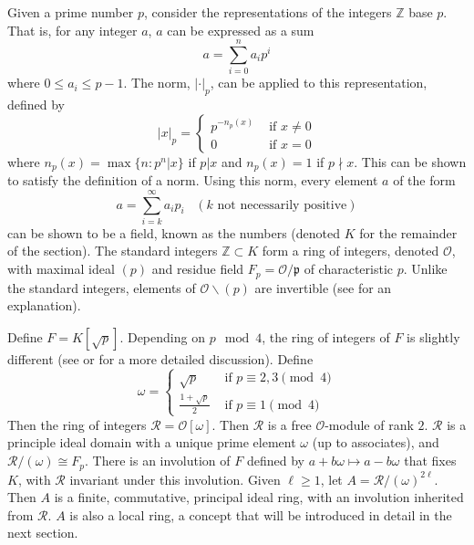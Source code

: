 Given a prime number $p$, consider the representations of the integers $\mathbb{Z}$ base $p$.
That is, for any integer $a$, $a$ can be expressed as a sum
\[
a = \sum_{i=0}^n a_i p^i
\]
where $0 \le a_i \le p - 1$.
The \padic norm, $|\cdot|_p$, can be applied to this representation, defined by
\[
|x|_p = \begin{cases}
p^{-n_p(x)} &\text{ if } x \ne 0\\
0 &\text{ if } x = 0
\end{cases}
\]
where $n_p(x) = \max \{n: p^n | x \}$ if $p | x$ and $n_p(x) = 1$ if $p \nmid x$.
This can be shown to satisfy the definition of a norm.
Using this norm, every element $a$ of the form
\[
a = \sum_{i=k}^\infty a_i p_i \;\;\; (k \text{ not necessarily positive})
\]
can be shown to be a field, known as the \padic numbers (denoted $K$ for the remainder of the section).
The standard integers $\mathbb{Z} \subset K$ form a ring of integers, denoted $\mathcal{O}$, 
with maximal ideal $(p)$ and residue field $F_p = \mathcal{O}/\mathfrak{p}$ of characteristic $p$.
Unlike the standard integers, elements of $\mathcal{O} \backslash (p)$ are invertible (see \cite{katok} for an explanation).

Define $F = K[\sqrt{p}]$.
Depending on $p \mod 4$, the ring of integers of $F$ is slightly different (see \cite{milneANT} or \cite{samuel} for a more detailed discussion).
Define
\[
\omega = \begin{cases}
\sqrt{p} &\text{ if } p \equiv 2,3 \pmod{4}\\
\frac{1 + \sqrt{p}}{2} &\text{ if } p \equiv 1 \pmod{4}
\end{cases}
\]
Then the ring of integers $\mathcal{R} = \mathcal{O}[\omega]$.
Then $\mathcal{R}$ is a free $\mathcal{O}$-module of rank $2$.
$\mathcal{R}$ is a principle ideal domain with a unique prime element $\omega$ (up to associates), and $\mathcal{R}/(\omega) \cong F_p$.
There is an involution of $F$ defined by $a + b \omega \mapsto a - b \omega$ that fixes $K$, with $\mathcal{R}$ invariant under this involution.
Given $\ell \ge 1$, let $A = \mathcal{R} / (\omega)^{2\ell}$.
Then $A$ is a finite, commutative, principal ideal ring, with an involution inherited from $\mathcal{R}$.
$A$ is also a local ring, a concept that will be introduced in detail in the next section.


